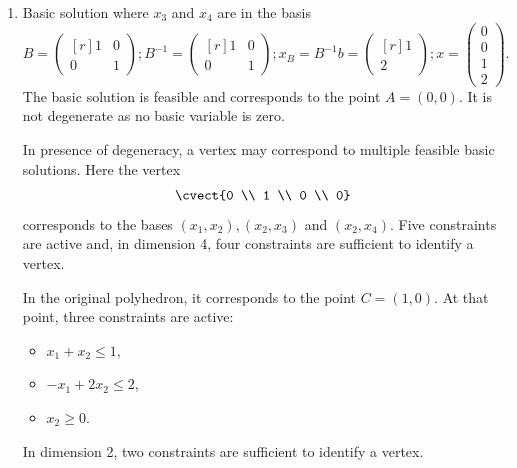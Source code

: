 \begin{enumerate}
\item Basic solution where $x_3$ and $x_4$ are in the basis
$$
B =
\begin{pmatrix*}[r]
1&0\\
0&1
\end{pmatrix*}
;
B^{-1} =
\begin{pmatrix*}[r]
1&0\\
0 & 1
\end{pmatrix*}
;
x_B=B^{-1}b=
\begin{pmatrix*}[r]
1\\
2
\end{pmatrix*}
;
x
=
\begin{pmatrix}
0\\
0\\
1\\
2
\end{pmatrix}.
$$
The basic solution is feasible and corresponds to the point
$A=(0,0)$. It is not degenerate as no basic variable is zero.


In presence of degeneracy,  a vertex may correspond to multiple
feasible basic solutions. Here the vertex
\[
\cvect{0 \\ 1 \\ 0 \\ 0}
\]
corresponds to the
bases $(x_1,x_2),(x_2,x_3)$ and  $(x_2,x_4)$. Five constraints are
active and, in dimension 4, four constraints are
sufficient to identify a vertex.

In the original polyhedron, it corresponds to the point $C=(1,0)$. At
that point, three constraints are active:
\begin{itemize}
\item $x_1+ x_2 \leq 1$,
\item $-x_1 + 2 x_2 \leq 2$,
\item $x_2 \geq 0$.
\end{itemize}
In dimension 2, two constraints are sufficient to identify a vertex.


\end{enumerate}


